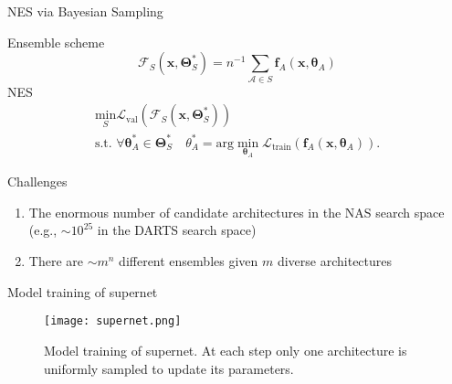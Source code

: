 \documentclass{beamer}
\def\*#1{\mathbf{#1}}
\begin{document}
\begin{frame}{NES via Bayesian Sampling}

Ensemble scheme
\[\mathcal{F}_S(\*x, \*\Theta^*_S)=n^{-1}\sum\limits_{\mathcal{A}\in S}\*f_A(\*x, \*\theta_A)\]
NES
\begin{gather}
 \underset{S}{\text{min}} \mathcal{L}_{\text{val}}(\mathcal{F}_S(\*x, \*\Theta^*_S)) \\
 \text{s.t. } \forall \*\theta^*_A \in \*\Theta^*_S \quad \theta^*_A = \text{arg} \min\limits_{\*\theta_A} \mathcal{L}_{\text{train}}(\*f_A(\*x, \*\theta_A)).
\end{gather}

\begin{block}{Challenges}
    \begin{enumerate}
        \item  The enormous number of candidate architectures in the NAS search space (e.g., $
        \sim 10^{25}$ in the DARTS search space)
        \item There are $\sim m^n$ different ensembles given $m$ diverse architectures
    \end{enumerate}
\end{block}

\end{frame}


\begin{frame}{Model training of supernet}

\begin{figure}
    \centering
    \texttt{[image: supernet.png]}
    \caption{Model training of supernet. At each step only one architecture is uniformly sampled to update its parameters.}
    \label{fig:supernet}
\end{figure}
 
\end{frame}
\end{document}

